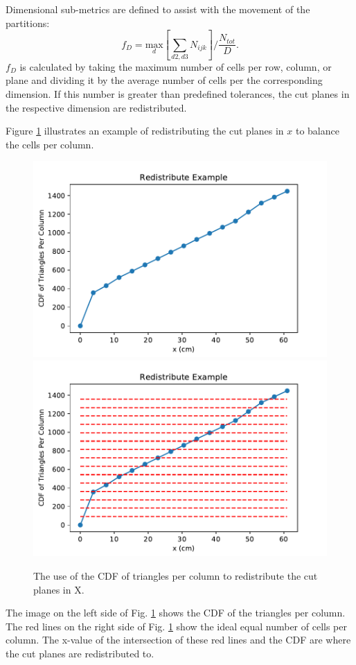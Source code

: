 \documentclass[letterpaper]{mandc2019}
\begin{document}
Dimensional sub-metrics are defined to assist with the movement of the partitions:
\begin{equation}
f_{D} = \underset{d}{\text{max}}[\sum_{d2,d3} N_{ijk}]/\frac{N_{tot}}{D}.
\label{f_d}
\end{equation}
$f_{D}$ is calculated by taking the maximum number of cells per row, column, or plane and dividing it by the average number of cells per the corresponding dimension. If this number is greater than predefined tolerances, the cut planes in the respective dimension are redistributed. 

Figure \ref{redistribute} illustrates an example of redistributing the cut planes in $x$ to balance the cells per column.
\begin{figure}[!htb]
\centering
\includegraphics[scale=0.4]{Figures/redistribute_before.pdf}
\includegraphics[scale=0.4]{Figures/redistribute_after.pdf}
\caption{The use of the CDF of triangles per column to redistribute the cut planes in X.}
\label{redistribute}
\end{figure}
The image on the left side of Fig. \ref{redistribute} shows the CDF of the triangles per column. The red lines on the right side of Fig. \ref{redistribute} show the ideal equal number of cells per column. The x-value of the intersection of these red lines and the CDF are where the cut planes are redistributed to. 
\FloatBarrier 
\end{document}
